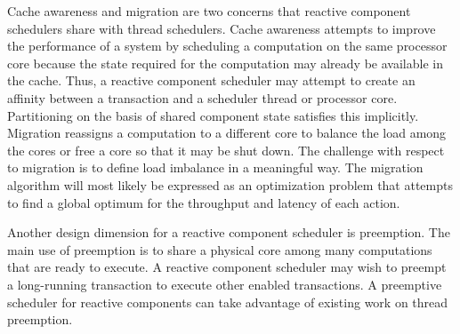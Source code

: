 Cache awareness and migration are two concerns that reactive component schedulers share with thread schedulers.
Cache awareness attempts to improve the performance of a system by scheduling a computation on the same processor core because the state required for the computation may already be available in the cache.
Thus, a reactive component scheduler may attempt to create an affinity between a transaction and a scheduler thread or processor core.
Partitioning on the basis of shared component state satisfies this implicitly.
Migration reassigns a computation to a different core to balance the load among the cores or free a core so that it may be shut down.
The challenge with respect to migration is to define load imbalance in a meaningful way.
The migration algorithm will most likely be expressed as an optimization problem that attempts to find a global optimum for the throughput and latency of each action.

Another design dimension for a reactive component scheduler is preemption.
The main use of preemption is to share a physical core among many computations that are ready to execute.
A reactive component scheduler may wish to preempt a long-running transaction to execute other enabled transactions.
A preemptive scheduler for reactive components can take advantage of existing work on thread preemption.




